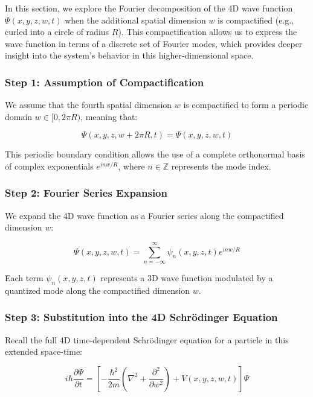 \documentclass[12pt]{article}
\begin{document}
In this section, we explore the Fourier decomposition of the 4D wave function \( \Psi(x, y, z, w, t) \) when the additional spatial dimension \( w \) is compactified (e.g., curled into a circle of radius \( R \)). This compactification allows us to express the wave function in terms of a discrete set of Fourier modes, which provides deeper insight into the system’s behavior in this higher-dimensional space.

\subsubsection*{Step 1: Assumption of Compactification}

We assume that the fourth spatial dimension \( w \) is compactified to form a periodic domain \( w \in [0, 2\pi R) \), meaning that:

\begin{equation}
\Psi(x, y, z, w + 2\pi R, t) = \Psi(x, y, z, w, t)
\end{equation}

This periodic boundary condition allows the use of a complete orthonormal basis of complex exponentials \( e^{i n w / R} \), where \( n \in \mathbb{Z} \) represents the mode index.

\subsubsection*{Step 2: Fourier Series Expansion}

We expand the 4D wave function as a Fourier series along the compactified dimension \( w \):

\begin{equation}
\Psi(x, y, z, w, t) = \sum_{n=-\infty}^{\infty} \psi_n(x, y, z, t) e^{i n w / R}
\end{equation}

Each term \( \psi_n(x, y, z, t) \) represents a 3D wave function modulated by a quantized mode along the compactified dimension \( w \).

\subsubsection*{Step 3: Substitution into the 4D Schrödinger Equation}

Recall the full 4D time-dependent Schrödinger equation for a particle in this extended space-time:

\begin{equation}
    i\hbar \frac{\partial \Psi}{\partial t} = \left[ -\frac{\hbar^2}{2m} \left( \nabla^2 + \frac{\partial^2}{\partial w^2} \right) + V(x, y, z, w, t) \right] \Psi
\end{equation}
\end{document}
